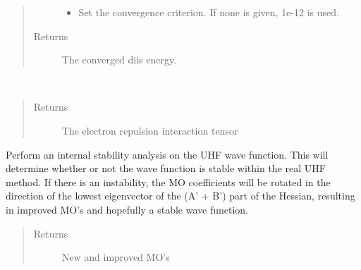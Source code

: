 \documentclass[letterpaper,10pt,english]{sphinxmanual}
\begin{document}
\begin{fulllineitems}
\begin{fulllineitems}
\begin{quote}
\begin{description}
\begin{itemize}
\item {} 
 \textendash{} Set the convergence criterion. If none is given, 1e-12 is used.

\end{itemize}

\item[{Returns}] \leavevmode
The converged diis energy.

\end{description}\end{quote}

\end{fulllineitems}


\begin{fulllineitems}
\label{\detokenize{UHF:ghf.UHF.UHF.get_two_e}}~\begin{quote}\begin{description}
\item[{Returns}] \leavevmode
The electron repulsion interaction tensor

\end{description}\end{quote}

\end{fulllineitems}


\begin{fulllineitems}
\label{\detokenize{UHF:ghf.UHF.UHF.internal_stability_analysis}}
Perform an internal stability analysis on the UHF wave function. This will determine whether or not the wave
function is stable within the real UHF method. If there is an instability, the MO coefficients will be rotated
in the direction of the lowest eigenvector of the (A’ + B’) part of the Hessian, resulting in improved MO’s and
hopefully a stable wave function.
\begin{quote}\begin{description}
\item[{Returns}] \leavevmode
New and improved MO’s

\end{description}\end{quote}


\end{fulllineitems}
\end{fulllineitems}
\end{document}

